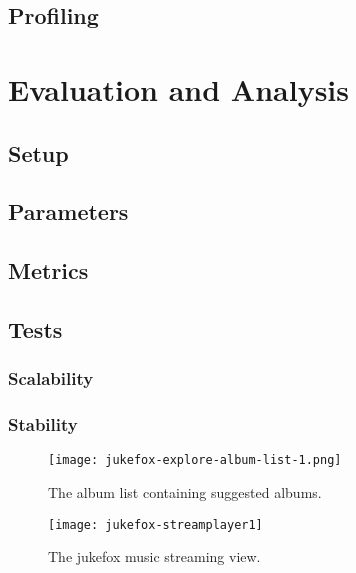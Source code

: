 \documentclass[a4paper, oneside]{csthesis}
\begin{document}
\section{Profiling}


\chapter{Evaluation and Analysis}
\label{ch:evaluation}

\section{Setup}

\section{Parameters}

\section{Metrics}

\section{Tests}

\subsection{Scalability}
\subsection{Stability}


    \begin{figure}[htbp]
        \centering
        \begin{minipage}[t]{0.45\textwidth}
            \centering
            \texttt{[image: jukefox-explore-album-list-1.png]}
            \caption{The album list containing suggested albums.}
            \label{fig:album_list1}
        \end{minipage}
        \begin{minipage}[t]{0.45\textwidth}
            \centering
            \texttt{[image: jukefox-streamplayer1]}
            \caption{The jukefox music streaming view.}
            \label{fig:stream_player}
        \end{minipage}
    \end{figure}
\end{document}
